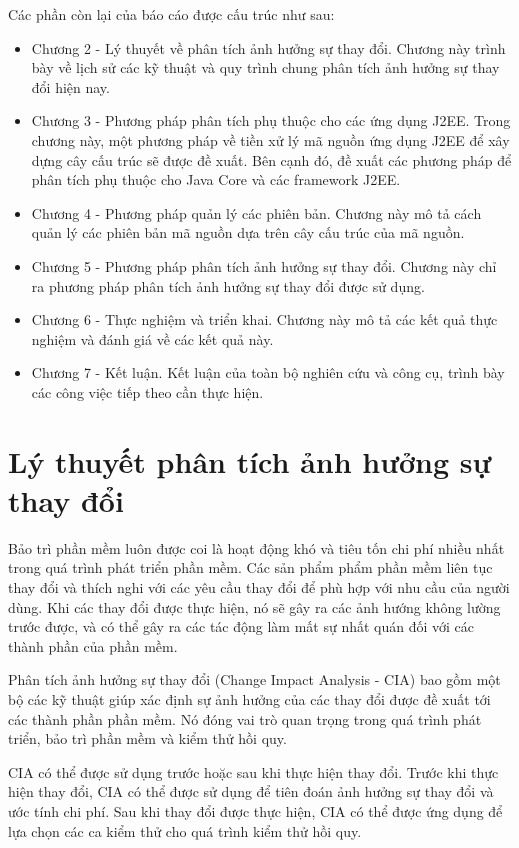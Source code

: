 \documentclass[12pt]{report}
\begin{document}
Các phần còn lại của báo cáo được cấu trúc như sau:
\begin{itemize}
\item Chương 2 - Lý thuyết về phân tích ảnh hưởng sự thay đổi. Chương này trình bày về lịch sử các kỹ thuật và quy trình chung phân tích ảnh hưởng sự thay đổi hiện nay.
\item Chương 3 - Phương pháp phân tích phụ thuộc cho các ứng dụng J2EE. Trong chương này, một phương pháp về tiền xử lý mã nguồn ứng dụng J2EE để xây dựng cây cấu trúc sẽ được đề xuất. Bên cạnh đó, đề xuất các phương pháp để phân tích phụ thuộc cho Java Core và các framework J2EE.
\item Chương 4 - Phương pháp quản lý các phiên bản. Chương này mô tả cách quản lý các phiên bản mã nguồn dựa trên cây cấu trúc của mã nguồn.
\item Chương 5 - Phương pháp phân tích ảnh hưởng sự thay đổi. Chương này chỉ ra phương pháp phân tích ảnh hưởng sự thay đổi được sử dụng.
\item Chương 6 - Thực nghiệm và triển khai. Chương này mô tả các kết quả thực nghiệm và đánh giá về các kết quả này.
\item Chương 7 - Kết luận. Kết luận của toàn bộ nghiên cứu và công cụ, trình bày các công việc tiếp theo cần thực hiện.
\end{itemize}


\newpage	
\chapter{Lý thuyết phân tích ảnh hưởng sự thay đổi}
Bảo trì phần mềm luôn được coi là hoạt động khó và tiêu tốn chi phí nhiều nhất trong quá trình phát triển phần mềm. Các sản phẩm phẩm phần mềm liên tục thay đổi và thích nghi với các yêu cầu thay đổi để phù hợp với nhu cầu của người dùng. Khi các thay đổi được thực hiện, nó sẽ gây ra các ảnh hướng không lường trước được, và có thể gây ra các tác động làm mất sự nhất quán đối với các thành phần của phần mềm.

Phân tích ảnh hưởng sự thay đổi (Change Impact Analysis - CIA) bao gồm một bộ các kỹ thuật giúp xác định sự ảnh hưởng của các thay đổi được đề xuất tới các thành phần phần mềm. Nó đóng vai trò quan trọng trong quá trình phát triển, bảo trì phần mềm và kiểm thử hồi quy.

CIA có thể được sử dụng trước hoặc sau khi thực hiện thay đổi. Trước khi thực hiện thay đổi, CIA có thể được sử dụng để tiên đoán ảnh hưởng sự thay đổi và ước tính chi phí. Sau khi thay đổi được thực hiện, CIA có thể được ứng dụng để lựa chọn các ca kiểm thử cho quá trình kiểm thử hồi quy.
\end{document}
